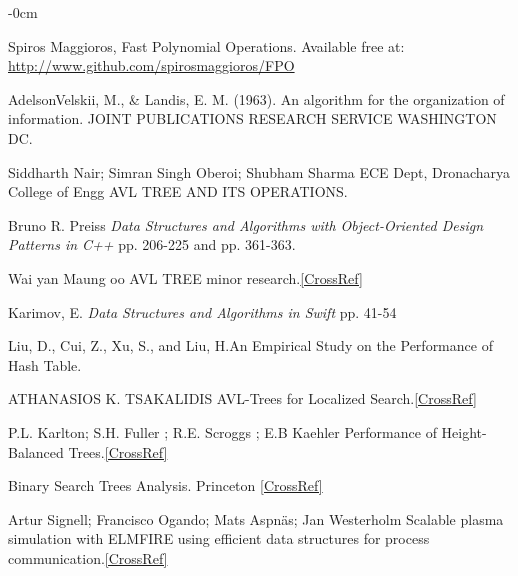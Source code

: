\documentclass[journal,article,submit,moreauthors,algorithms]{Definitions/mdpi}
\begin{document}
\begin{adjustwidth}{-\extralength}{0cm}


\begin{thebibliography}{999}
Spiros Maggioros, Fast Polynomial Operations. Available free at: \url{http://www.github.com/spirosmaggioros/FPO}

 AdelsonVelskii, M., \& Landis, E. M. (1963). An algorithm for the organization of information. JOINT PUBLICATIONS RESEARCH SERVICE WASHINGTON DC.

Siddharth Nair; Simran Singh Oberoi; Shubham Sharma ECE Dept, Dronacharya College of Engg AVL TREE AND ITS OPERATIONS.

 Bruno R. Preiss \textit{Data Structures and Algorithms with Object-Oriented Design Patterns in C++} pp. 206-225 and pp. 361-363.

Wai yan Maung oo AVL TREE minor research.\href{https://www.academia.edu/35803329/AVL_TREE_minor_research_docx}{[CrossRef]}

 Karimov, E. \textit{Data Structures and Algorithms in Swift} pp. 41-54

Liu, D., Cui, Z., Xu, S., and Liu, H.An Empirical Study on the Performance of Hash Table.

ATHANASIOS K. TSAKALIDIS AVL-Trees for Localized Search.\href{https://www.sciencedirect.com/science/article/pii/S0019995885800346}{[CrossRef]}

P.L. Karlton; S.H. Fuller ; R.E. Scroggs ; E.B Kaehler Performance of Height-Balanced Trees.\href{https://www.semanticscholar.org/paper/Performance-of-height-balanced-trees-Karlton-Fuller/0c55c77491131897059f4052136b33fb3d119d63}{[CrossRef]}

 Binary Search Trees Analysis. Princeton \href{https://algs4.cs.princeton.edu/32bst/index.php}{[CrossRef]}

Artur Signell; Francisco Ogando; Mats Aspnäs; Jan Westerholm Scalable plasma simulation with ELMFIRE using efficient data structures for process communication.\href{https://www.sciencedirect.com/science/article/abs/pii/S0010465508001343?via%3Dihub}{[CrossRef]}


\end{thebibliography}
\end{adjustwidth}
\end{document}

